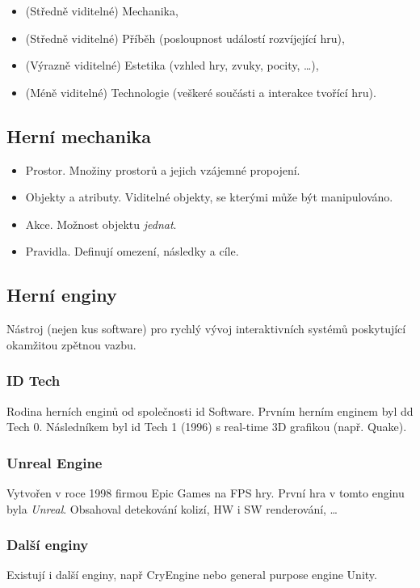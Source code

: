 \begin{itemize}
    \item (Středně viditelné) Mechanika,
    \item (Středně viditelné) Příběh (posloupnost událostí rozvíjející hru),
    \item (Výrazně viditelné) Estetika (vzhled hry, zvuky, pocity, \dots),
    \item (Méně viditelné) Technologie (veškeré součásti a interakce tvořící hru).
\end{itemize}

\subsection*{Herní mechanika}

\begin{itemize}
    \item Prostor. Množiny prostorů a jejich vzájemné propojení.
    \item Objekty a atributy. Viditelné objekty, se kterými může být manipulováno.
    \item Akce. Možnost objektu \textit{jednat}.
    \item Pravidla. Definují omezení, následky a cíle.
\end{itemize}

\subsection*{Herní enginy}

Nástroj (nejen kus software) pro rychlý vývoj interaktivních systémů poskytující okamžitou zpětnou vazbu.

\subsubsection*{ID Tech}

Rodina herních enginů od společnosti id Software.
Prvním herním enginem byl dd Tech 0.
Následníkem byl id Tech 1 (1996) s real-time 3D grafikou (např. Quake).

\subsubsection*{Unreal Engine}

Vytvořen v roce 1998 firmou Epic Games na FPS hry.
První hra v tomto enginu byla \textit{Unreal}.
Obsahoval detekování kolizí, HW i SW renderování, \dots

\subsubsection*{Další enginy}

Existují i další enginy, např CryEngine nebo general purpose engine Unity.
